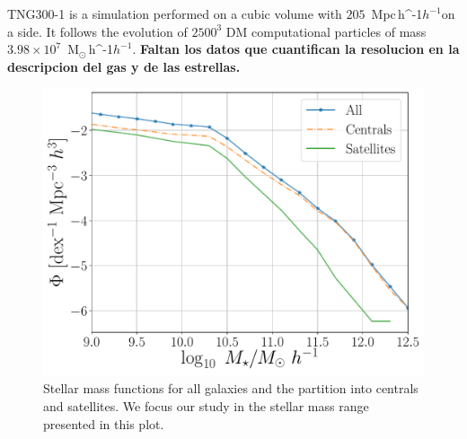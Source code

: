 \documentclass[fleqn,usenatbib]{mnras}
\newcommand{\Msunh}{\,{\rm M}$_{\odot}$\,\ifmmode h^{-1}\else $h^{-1}$\fi}
\newcommand{\Mpch}{\,{\rm Mpc}\,\ifmmode h^{-1}\else $h^{-1}$\fi}
\begin{document}
TNG300-1 is a simulation performed on a cubic volume
with  $205$ \Mpch on a side.
It follows the evolution of $2500^3$ DM computational particles of
mass $3.98 \times 10^7$ \Msunh. 
\textbf{Faltan los datos que cuantifican la resolucion en la
  descripcion del gas y de las estrellas.}



\begin{figure}
    \centering
    \includegraphics[width=1\columnwidth]{figuras/Histogramas.pdf}
    \caption{Stellar mass functions for all galaxies and the partition
      into centrals and satellites. We focus our study in the stellar
      mass range presented in this plot.} 
    \label{fig:stellar_fuction}
\end{figure}
\end{document}
